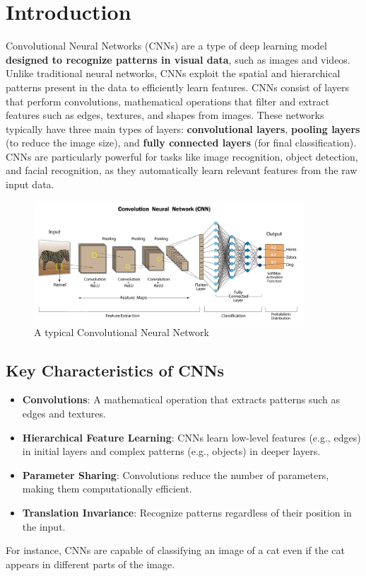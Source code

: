\chapter{Introduction}\label{chp:1}
Convolutional Neural Networks (CNNs) are a type of deep learning model \textbf{designed to recognize patterns in visual data}, such as images and videos. Unlike traditional neural networks, CNNs exploit the spatial and hierarchical patterns present in the data to efficiently learn features. CNNs consist of layers that perform convolutions, mathematical operations that filter and extract features such as edges, textures, and shapes from images. These networks typically have three main types of layers: \textbf{convolutional layers}, \textbf{pooling layers} (to reduce the image size), and \textbf{fully connected layers} (for final classification). CNNs are particularly powerful for tasks like image recognition, object detection, and facial recognition, as they automatically learn relevant features from the raw input data.

\begin{figure}[h!]
    \centering
    \includegraphics[width=0.9\textwidth]{images/figure1.png}
    \caption{A typical Convolutional Neural Network}
    \label{fig:1}
\end{figure}

\section{Key Characteristics of CNNs}
\begin{itemize}
    \item \textbf{Convolutions}: A mathematical operation that extracts patterns such as edges and textures.
    \item \textbf{Hierarchical Feature Learning}: CNNs learn low-level features (e.g., edges) in initial layers and complex patterns (e.g., objects) in deeper layers.
    \item \textbf{Parameter Sharing}: Convolutions reduce the number of parameters, making them computationally efficient.
    \item \textbf{Translation Invariance}: Recognize patterns regardless of their position in the input.
\end{itemize}
For instance, CNNs are capable of classifying an image of a cat even if the cat appears in different parts of the image.

